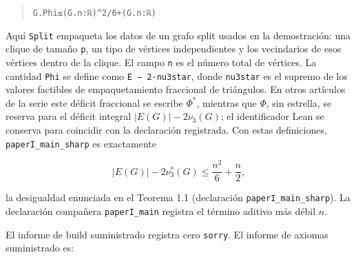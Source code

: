 \documentclass[spanish,11pt,a4paper]{article}
\begin{document}
\begin{quote}
{\noindent \hspace{1.8em}\nolinkurl{G.Phi}\hspace{0.45em}\nolinkurl{≤}\hspace{0.45em}\nolinkurl{(G.n}\hspace{0.45em}\nolinkurl{:}\hspace{0.45em}\nolinkurl{ℝ)}\hspace{0.45em}\nolinkurl{^}\hspace{0.45em}\nolinkurl{2}\hspace{0.45em}\nolinkurl{/}\hspace{0.45em}\nolinkurl{6}\hspace{0.45em}\nolinkurl{+}\hspace{0.45em}\nolinkurl{(G.n}\hspace{0.45em}\nolinkurl{:}\hspace{0.45em}\nolinkurl{ℝ)}\par
}
\end{quote}

Aquí \nolinkurl{Split} empaqueta los datos de un grafo split usados en la
demostración: una clique de tamaño \nolinkurl{p}, un tipo de vértices
independientes y los vecindarios de esos vértices dentro de la clique.
El campo \nolinkurl{n} es el número total de vértices. La cantidad
\nolinkurl{Phi} se define como
\texttt{\textbar{}E\textbar{}\ −\ 2·nu3star}, donde \nolinkurl{nu3star} es
el supremo de los valores factibles de empaquetamiento fraccional de
triángulos. En otros artículos de la serie este déficit fraccional se
escribe \(\Phi^*\), mientras que \(\Phi\), sin estrella, se reserva para
el déficit integral \(|E(G)|-2\nu_3(G)\); el identificador Lean se
conserva para coincidir con la declaración registrada. Con estas
definiciones, \nolinkurl{paperI_main_sharp} es exactamente

\[
|E(G)|-2\nu_3^*(G)\le \frac{n^2}{6}+\frac{n}{2},
\]

la desigualdad enunciada en el Teorema 1.1 (declaración
\nolinkurl{paperI_main_sharp}). La declaración compañera
\nolinkurl{paperI_main} registra el término aditivo más débil \(n\).

El informe de build suministrado registra cero \nolinkurl{sorry}. El
informe de axiomas suministrado es:
\end{document}
